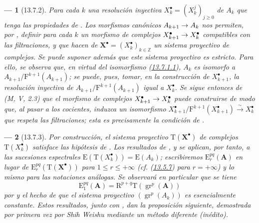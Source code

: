 \documentclass[10pt,oneside,openany]{book}
\theoremstyle{egaenv}\newtheorem*{env}{---}
\theoremstyle{egastatement}
\theoremstyle{egadescription}
\newcommand{\oldpage}[2][]{\marginnote{\normalfont\scriptsize\textbf{#1}\,|\,#2}\ignorespaces}
\renewcommand{\leq}{\leqslant}
\renewcommand{\geq}{\geqslant}
\renewcommand{\to}{\mathchoice{\longrightarrow}{\rightarrow}{\rightarrow}{\rightarrow}}
\begin{document}
\begin{env}[13.7.2]
\label{0.13.7.2}
\label{0.13.7.2-fr}
Para cada $k$ una \emph{resolución inyectiva} $X_k^\bullet=(X_k^j)_{j\geq0}$ de $A_k$ que tenga las
propiedades de .
Los morfismos canónicos $A_{k+1}\to A_k$ nos permiten, por
, definir para cada $k$ un morfismo de complejos
$X_{k+1}^\bullet\to X_k^\bullet$ compatibles
\oldpage[0\textsubscript{III}]{76}
con las filtraciones, y que hacen de
$\mathbf X^\bullet=(X_k^\bullet)_{k\in\mathbb Z}$ un \emph{sistema proyectivo} de complejos. Se puede suponer además que este sistema proyectivo es \emph{estricto}. Para ello, se observa que, en virtud del isomorfismo (\hyperref[0.13.7.1.1-fr]{13.7.1.1}), $A_k$ es isomorfo a $A_{k+1}/\mathrm F^{k+1}(A_{k+1})$; se puede, pues, tomar, en la construcción de $X_{k+1}^\bullet$, la resolución inyectiva de $A_{k+1}/\mathrm F^{k+1}(A_{k+1})$ \emph{igual} a
$X_k^\bullet$.
Se sigue entonces de (M, V, 2.3) que el morfismo de complejos
$X_{k+1}^\bullet\to X_k^\bullet$ puede
construirse de modo que, al pasar a los cocientes, induzca un
\emph{isomorfismo}
$X_{k+1}^\bullet/\mathrm F^{k+1}(X_{k+1}^\bullet)
\xrightarrow{\sim}X_k^\bullet$
que respeta las filtraciones; esta es precisamente la condición de
.
\end{env}

\begin{env}[13.7.3]
\label{0.13.7.3}
\label{0.13.7.3-fr}
Por construcción, el sistema proyectivo
$\mathrm T(\mathbf X^\bullet)$ de complejos
$\mathrm T(X_k^\bullet)$ satisface las hipótesis de
.
Los resultados de ,  y
 se aplican, por tanto, a las sucesiones espectrales
$\mathrm E(\mathrm T(X_k^\bullet))=\mathrm E(A_k)$; escribiremos $\mathrm E_r^{pq}(\mathbf A)$ en lugar de
$\mathrm E_r^{pq}(\mathrm T(\mathbf X^\bullet))$ para $1\leq r\leq+\infty$ (cf. (\hyperref[0.13.5.7-fr]{13.5.7}) para $r=+\infty$) y lo mismo para las notaciones análogas. Se observará en particular que se tiene \begin{equation}
\label{0.13.7.3.1-fr}
\tag{13.7.3.1}
\mathrm E_1^{pq}(\mathbf A)=
\mathrm R^{p+q}\mathrm T(\operatorname{gr}^p(\mathbf A))
\end{equation}
por  y el hecho de que el sistema proyectivo
$(\operatorname{gr}^p(A_k))$ es esencialmente constante.
Estos resultados, junto con , dan la proposición
siguiente, demostrada por primera vez por Shih Weishu mediante un método
diferente (inédito).
\end{env}
\end{document}

